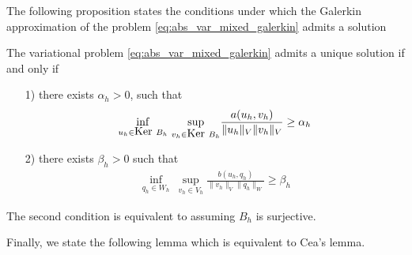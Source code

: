 The following proposition states the conditions under which the Galerkin approximation of the problem \eqref{eq:abs_var_mixed_galerkin} admits a solution
\begin{proposition}
  The variational problem \eqref{eq:abs_var_mixed_galerkin} admits a unique solution if and only if
\begin{itemize}
\item[1)] there exists $\alpha_h > 0$, such that 
  \begin{align}
      \underset{u_h \in \mbox{Ker}~ B_h}{\inf} ~ \underset{v_h \in \mbox{Ker}~ B_h}{\sup}
      \frac{a(u_h,v_h)}{\| u_h \|_V \| v_h \|_V} \geq \alpha_h 
  \end{align}

\item[2)] there exists $\beta_h>0$ such that
  \begin{align}
      \underset{q_h \in W_h}{\inf} ~ \underset{v_h \in V_h}{\sup}
      \frac{b(u_h,q_h)}{\| v_h \|_V \| q_h \|_W} \geq \beta_h 
  \end{align}
\end{itemize}
  \label{prop:abs_var_mixed_galerkin_existence}
\end{proposition}
\begin{remark}
  The second condition is equivalent to assuming $B_h$ is surjective.
\end{remark}
Finally, we state the following lemma which is equivalent to Cea's lemma.
